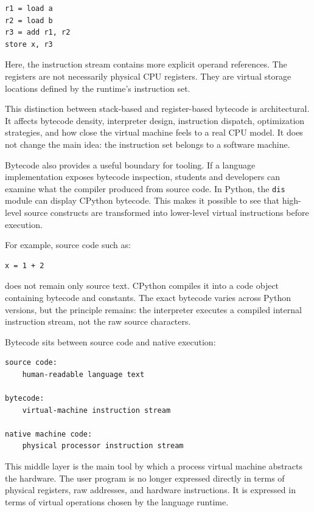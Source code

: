 \documentclass[a4paper,twoside]{report}
\begin{document}
\begin{verbatim}
r1 = load a
r2 = load b
r3 = add r1, r2
store x, r3
\end{verbatim}

Here, the instruction stream contains more explicit operand references. The registers are not necessarily physical CPU registers. They are virtual storage locations defined by the runtime's instruction set.

This distinction between stack-based and register-based bytecode is architectural. It affects bytecode density, interpreter design, instruction dispatch, optimization strategies, and how close the virtual machine feels to a real CPU model. It does not change the main idea: the instruction set belongs to a software machine.

Bytecode also provides a useful boundary for tooling. If a language implementation exposes bytecode inspection, students and developers can examine what the compiler produced from source code. In Python, the \texttt{dis} module can display CPython bytecode. This makes it possible to see that high-level source constructs are transformed into lower-level virtual instructions before execution.

For example, source code such as:

\begin{verbatim}
x = 1 + 2
\end{verbatim}

does not remain only source text. CPython compiles it into a code object containing bytecode and constants. The exact bytecode varies across Python versions, but the principle remains: the interpreter executes a compiled internal instruction stream, not the raw source characters.

Bytecode sits between source code and native execution:

\begin{verbatim}
source code:
    human-readable language text

bytecode:
    virtual-machine instruction stream

native machine code:
    physical processor instruction stream
\end{verbatim}

This middle layer is the main tool by which a process virtual machine abstracts the hardware. The user program is no longer expressed directly in terms of physical registers, raw addresses, and hardware instructions. It is expressed in terms of virtual operations chosen by the language runtime.
\end{document}

